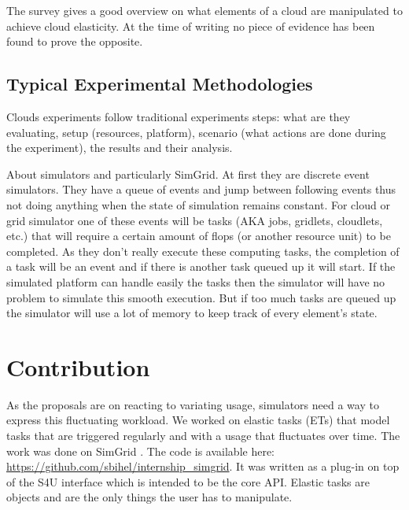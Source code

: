 \documentclass[a4paper, onecolumn, 11pt]{article}
\begin{document}
  The survey gives a good overview on what elements of a cloud are manipulated
  to achieve cloud elasticity. At the time of writing no piece of evidence has
  been found to prove the opposite.
  
  \subsection{Typical Experimental Methodologies}
  Clouds experiments follow traditional experiments steps: what are they
  evaluating, setup (resources, platform), scenario (what actions are done
  during the experiment), the results and their analysis.
  
  About simulators and particularly SimGrid. At first they are discrete event
  simulators. They have a queue of events and jump between following events thus
  not doing anything when the state of simulation remains constant. For cloud or
  grid simulator one of these events will be tasks (AKA jobs, gridlets,
  cloudlets, etc.) that will require a certain amount of flops (or another
  resource unit) to be completed. As they don't really execute these computing
  tasks, the completion of a task will be an event and if there is another task
  queued up it will start. If the simulated platform can handle easily the tasks
  then the simulator will have no problem to simulate this smooth execution. But
  if too much tasks are queued up the simulator will use a lot of memory to keep
  track of every element's state.


\section{Contribution} \label{contrib}
As the proposals are on reacting to variating usage, simulators need a way to
express this fluctuating workload. We worked on elastic tasks (ETs) that model
tasks that are triggered regularly and with a usage that fluctuates over time.
The work was done on SimGrid \cite{casanova:hal-01017319}. The code is available
here: \url{https://github.com/sbihel/internship_simgrid}. It was written as a
plug-in on top of the S4U interface which is intended to be the core API.
Elastic tasks are objects and are the only things the user has to manipulate.
\end{document}
